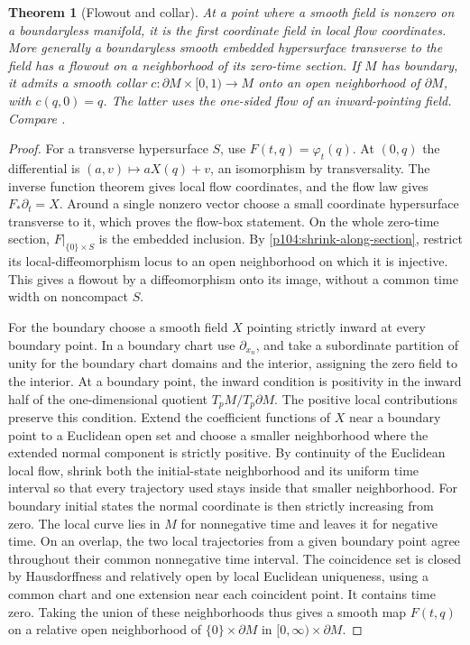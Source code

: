 \documentclass[11pt,oneside,openany]{book}
\newtheorem{theorem}{Theorem}[chapter]
\theoremstyle{definition}
\theoremstyle{remark}
\begin{document}
\begin{theorem}[Flowout and collar]\label{p104:M06.05}
At a point where a smooth field is nonzero on a boundaryless manifold, it is the first coordinate field in local flow coordinates. More generally a boundaryless smooth embedded hypersurface transverse to the field has a flowout on a neighborhood of its zero-time section. If \(M\) has boundary, it admits a smooth collar \(c:\partial M\times[0,1)\to M\) onto an open neighborhood of \(\partial M\), with \(c(q,0)=q\). The latter uses the one-sided flow of an inward-pointing field. Compare \cite[Theorems 9.20, 9.24--9.25 and Problem 9-11]{lee}.
\end{theorem}
\begin{proof}
For a transverse hypersurface \(S\), use \(F(t,q)=\varphi_t(q)\). At \((0,q)\) the differential is \((a,v)\mapsto aX(q)+v\), an isomorphism by transversality. The inverse function theorem gives local flow coordinates, and the flow law gives \(F_*\partial_t=X\). Around a single nonzero vector choose a small coordinate hypersurface transverse to it, which proves the flow-box statement. On the whole zero-time section, \(F|_{\{0\}\times S}\) is the embedded inclusion. By \cref{p104:shrink-along-section}, restrict its local-diffeomorphism locus to an open neighborhood on which it is injective. This gives a flowout by a diffeomorphism onto its image, without a common time width on noncompact \(S\).

For the boundary choose a smooth field \(X\) pointing strictly inward at every boundary point. In a boundary chart use \(\partial_{x_n}\), and take a subordinate partition of unity for the boundary chart domains and the interior, assigning the zero field to the interior. At a boundary point, the inward condition is positivity in the inward half of the one-dimensional quotient \(T_pM/T_p\partial M\). The positive local contributions preserve this condition. Extend the coefficient functions of \(X\) near a boundary point to a Euclidean open set and choose a smaller neighborhood where the extended normal component is strictly positive. By continuity of the Euclidean local flow, shrink both the initial-state neighborhood and its uniform time interval so that every trajectory used stays inside that smaller neighborhood. For boundary initial states the normal coordinate is then strictly increasing from zero. The local curve lies in \(M\) for nonnegative time and leaves it for negative time. On an overlap, the two local trajectories from a given boundary point agree throughout their common nonnegative time interval. The coincidence set is closed by Hausdorffness and relatively open by local Euclidean uniqueness, using a common chart and one extension near each coincident point. It contains time zero. Taking the union of these neighborhoods thus gives a smooth map \(F(t,q)\) on a relative open neighborhood of \(\{0\}\times\partial M\) in \([0,\infty)\times\partial M\).


\end{proof}
\end{document}

